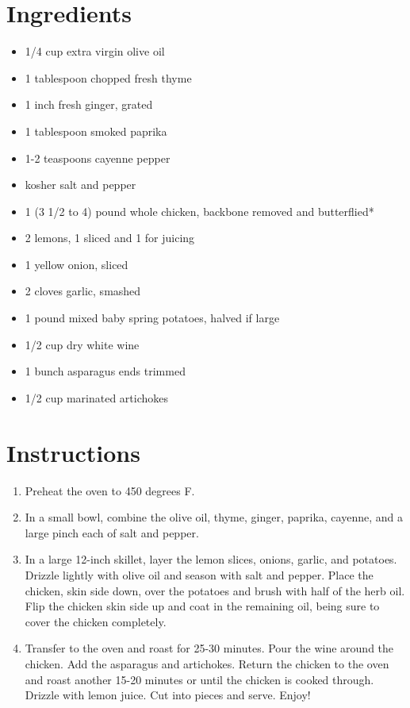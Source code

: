 \documentclass[
  letterpaper,
  DIV=11,
  numbers=noendperiod,
  titlepage=false]{scrreprt}
\providecommand{\tightlist}{%
  \setlength{\itemsep}{0pt}\setlength{\parskip}{0pt}}\usepackage{longtable,booktabs,array}
\begin{document}
\section{Ingredients}\label{ingredients-19}

\begin{itemize}
\tightlist
\item
  1/4 cup extra virgin olive oil
\item
  1 tablespoon chopped fresh thyme
\item
  1 inch fresh ginger, grated
\item
  1 tablespoon smoked paprika
\item
  1-2 teaspoons cayenne pepper
\item
  kosher salt and pepper
\item
  1 (3 1/2 to 4) pound whole chicken, backbone removed and butterflied*
\item
  2 lemons, 1 sliced and 1 for juicing
\item
  1 yellow onion, sliced
\item
  2 cloves garlic, smashed
\item
  1 pound mixed baby spring potatoes, halved if large
\item
  1/2 cup dry white wine
\item
  1 bunch asparagus ends trimmed
\item
  1/2 cup marinated artichokes
\end{itemize}

\section{Instructions}\label{instructions-19}

\begin{enumerate}
\def\labelenumi{\arabic{enumi}.}
\tightlist
\item
  Preheat the oven to 450 degrees F.
\item
  In a small bowl, combine the olive oil, thyme, ginger, paprika,
  cayenne, and a large pinch each of salt and pepper.
\item
  In a large 12-inch skillet, layer the lemon slices, onions, garlic,
  and potatoes. Drizzle lightly with olive oil and season with salt and
  pepper. Place the chicken, skin side down, over the potatoes and brush
  with half of the herb oil. Flip the chicken skin side up and coat in
  the remaining oil, being sure to cover the chicken completely.
\item
  Transfer to the oven and roast for 25-30 minutes. Pour the wine around
  the chicken. Add the asparagus and artichokes. Return the chicken to
  the oven and roast another 15-20 minutes or until the chicken is
  cooked through. Drizzle with lemon juice. Cut into pieces and serve.
  Enjoy!
\end{enumerate}
\end{document}
